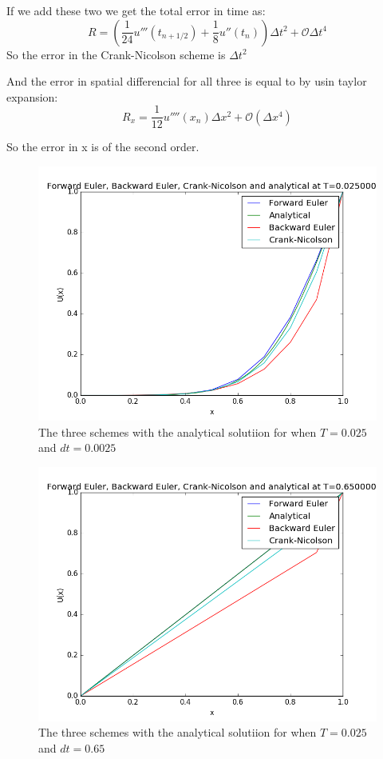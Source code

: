\documentclass[a4paper,10pt]{article}
\begin{document}
If we add these two we get the total error in time as:
\begin{equation}
 R = (\frac{1}{24} u'''(t_{n+1/2}) + \frac{1}{8}u''(t_n)) \Delta t^2 + \mathcal{O}\Delta t^4 
\end{equation}
So the error in the Crank-Nicolson scheme is $\Delta t^2$

And the error in spatial differencial for all three is equal to by usin taylor expansion:
\begin{equation}
 R_x = \frac{1}{12}u''''(x_n) \Delta x^2 + \mathcal{O}(\Delta x^4)
\end{equation}

So the error in x is of the second order.

\begin{figure}
  \includegraphics[scale=0.5]{alldt025analyticalt1}
    \caption{The three schemes with the analytical solutiion for when $T = 0.025$ and $dt = 0.0025$}
    \label{fig:NumAna0025}
\end{figure}

\begin{figure}
  \includegraphics[scale=0.5]{alldt025analyticalt2}
    \caption{The three schemes with the analytical solutiion for when $T = 0.025$ and $dt = 0.65$}
    \label{fig:NumAna065}
\end{figure}
\end{document}

